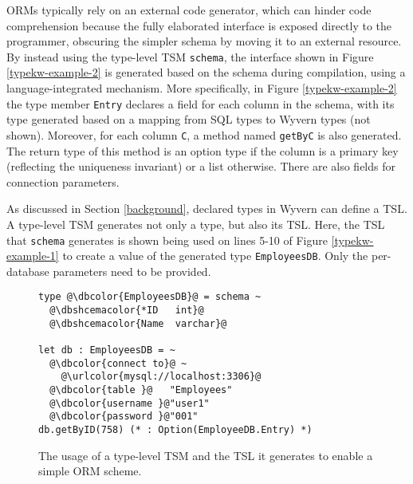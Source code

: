 \documentclass{sig-alternate}[10pt]
\newcommand{\lstinlinew}[1]{\lstinline[style=wyvern]{#1}}
\newcommand{\urlcolor}[1]{\textcolor[HTML]{FFCC33}{#1}}
\newcommand{\dbcolor}[1]{\textcolor[HTML]{FF47FF}{#1}}
\newcommand{\dbshcemacolor}[1]{\textcolor[HTML]{5AC3D1}{#1}}
\newcommand{\mycaption}[1]{\vspace{-10px}\caption{#1}\vspace{-10px}}
\begin{document}
ORMs typically rely on an external code generator, which can hinder code comprehension because the fully elaborated interface is exposed directly to the programmer, obscuring the simpler schema by moving it to an external resource. By instead using the type-level TSM \lstinlinew{schema}, the interface shown in Figure \ref{typekw-example-2} is generated based on the schema during compilation, using a language-integrated mechanism. More specifically, in Figure \ref{typekw-example-2} the type member \lstinlinew{Entry} declares a field for each column in the schema, with its type generated based on a mapping from SQL types to Wyvern types (not shown). Moreover, for each column \lstinlinew{C}, a method named \lstinlinew{getByC} is also generated. The return type of this method is an option type if the column is a primary key (reflecting the uniqueness invariant) or a list otherwise. There are also fields for connection parameters. 

As discussed in Section \ref{background}, declared types in Wyvern can define a TSL. A type-level TSM   generates not only a type, but also its TSL. Here, the TSL that \lstinlinew{schema} generates is shown being used on lines 5-10 of Figure \ref{typekw-example-1} to create a value of the generated type \lstinlinew{EmployeesDB}. Only the per-database parameters need to be provided. %

\begin{figure}[t]
\begin{lstlisting}[style=wyvern]
type @\dbcolor{EmployeesDB}@ = schema ~
  @\dbshcemacolor{*ID   int}@
  @\dbshcemacolor{Name  varchar}@

let db : EmployeesDB = ~
  @\dbcolor{connect to}@ ~
    @\urlcolor{mysql://localhost:3306}@
  @\dbcolor{table }@   "Employees"
  @\dbcolor{username }@"user1"
  @\dbcolor{password }@"001"
db.getByID(758) (* : Option(EmployeeDB.Entry) *)
\end{lstlisting}
\mycaption{The usage of a type-level TSM and the TSL it generates to enable a simple ORM scheme.}
\label{f-tykwexample}
\end{figure}
\end{document}
